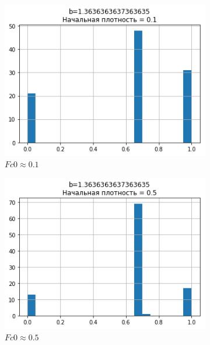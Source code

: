 \documentclass[a4paper,12pt]{article}
\begin{document}
\begin{figure}[h]
	\centering
	\begin{subfigure}[b]{0.48\textwidth}
		\includegraphics[width = \textwidth]{b1,3_Fc0,1_hist.png}
		\caption{$Fc0 \approx 0.1$}
	\end{subfigure}
	\begin{subfigure}[b]{0.48\textwidth}
		\includegraphics[width = \textwidth]{b1,3_Fc0,5_hist.png}
		\caption{$Fc0 \approx 0.5$}
	\end{subfigure}
	\begin{subfigure}[b]{0.48\textwidth}

\end{subfigure}
\end{figure}
\end{document}
